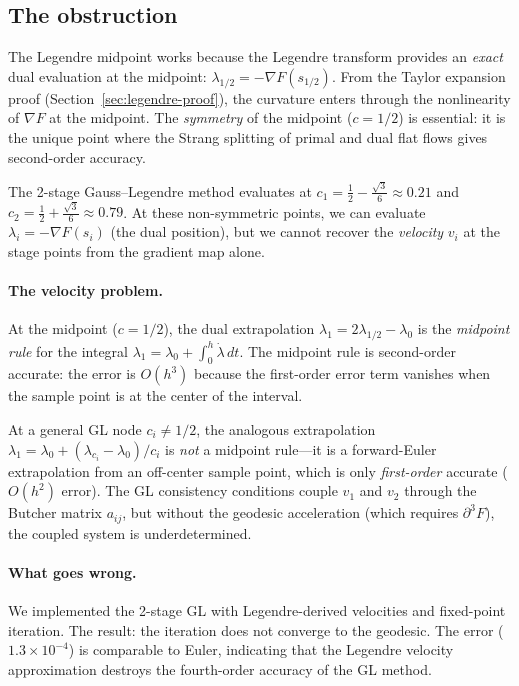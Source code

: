 \documentclass[11pt]{article}
\begin{document}
\subsection{The obstruction}

The Legendre midpoint works because the Legendre transform provides
an \emph{exact} dual evaluation at the midpoint: $\lambda_{1/2} = -\nabla F(s_{1/2})$.
From the Taylor expansion proof (Section~\ref{sec:legendre-proof}), the
curvature enters through the nonlinearity of $\nabla F$ at the midpoint.
The \emph{symmetry} of the midpoint ($c = 1/2$) is essential: it is the
unique point where the Strang splitting of primal and dual flat flows
gives second-order accuracy.

The 2-stage Gauss--Legendre method evaluates at $c_1 = \frac{1}{2} - \frac{\sqrt{3}}{6}
\approx 0.21$ and $c_2 = \frac{1}{2} + \frac{\sqrt{3}}{6} \approx 0.79$.
At these non-symmetric points, we can evaluate $\lambda_i = -\nabla F(s_i)$
(the dual position), but we cannot recover the \emph{velocity} $v_i$ at the
stage points from the gradient map alone.

\paragraph{The velocity problem.}
At the midpoint ($c = 1/2$), the dual extrapolation
$\lambda_1 = 2\lambda_{1/2} - \lambda_0$ is the \emph{midpoint rule}
for the integral $\lambda_1 = \lambda_0 + \int_0^h \dot\lambda \, dt$.
The midpoint rule is second-order accurate: the error is $O(h^3)$
because the first-order error term vanishes when the sample point is
at the center of the interval.

At a general GL node $c_i \neq 1/2$, the analogous extrapolation
$\lambda_1 = \lambda_0 + (\lambda_{c_i} - \lambda_0)/c_i$ is
\emph{not} a midpoint rule---it is a forward-Euler extrapolation
from an off-center sample point, which is only \emph{first-order}
accurate ($O(h^2)$ error).  The GL consistency conditions couple
$v_1$ and $v_2$ through the Butcher matrix $a_{ij}$, but without
the geodesic acceleration (which requires $\partial^3 F$), the
coupled system is underdetermined.

\paragraph{What goes wrong.}
We implemented the 2-stage GL with Legendre-derived velocities and
fixed-point iteration.  The result: the iteration does not converge
to the geodesic.  The error ($1.3 \times 10^{-4}$) is comparable to
Euler, indicating that the Legendre velocity approximation destroys
the fourth-order accuracy of the GL method.
\end{document}
